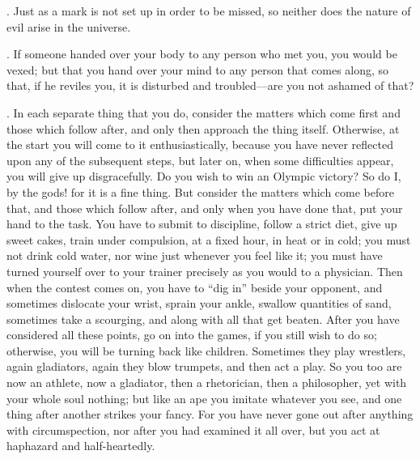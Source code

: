 . Just as a mark is not set up in order to be missed, so neither does the nature of evil arise in the universe.

. If someone handed over your body to any person who met you, you would be vexed; but that you hand over your mind to any person that comes along, so that, if he reviles you, it is disturbed and troubled—are you not ashamed of that?

. In each separate thing that you do, consider the matters which come first and those which follow after, and only then approach the thing itself. Otherwise, at the start you will come to it enthusiastically, because you have never reflected upon any of the subsequent steps, but later on, when some difficulties appear, you will give up disgracefully. Do you wish to win an Olympic victory? So do I, by the gods! for it is a fine thing. But consider the matters which come before that, and those which follow after, and only when you have done that, put your hand to the task. You have to submit to discipline, follow a strict diet, give up sweet cakes, train under compulsion, at a fixed hour, in heat or in cold; you must not drink cold water, nor wine just whenever you feel like it; you must have turned yourself over to your trainer precisely as you would to a physician. Then when the contest comes on, you have to ``dig in'' beside your opponent, and sometimes dislocate your wrist, sprain your ankle, swallow quantities of sand, sometimes take a scourging, and along with all that get beaten. After you have considered all these points, go on into the games, if you still wish to do so; otherwise, you will be turning back like children. Sometimes they play wrestlers, again gladiators, again they blow trumpets, and then act a play. So you too are now an athlete, now a gladiator, then a rhetorician, then a philosopher, yet with your whole soul nothing; but like an ape you imitate whatever you see, and one thing after another strikes your fancy. For you have never gone out after anything with circumspection, nor after you had examined it all over, but you act at haphazard and half-heartedly.

